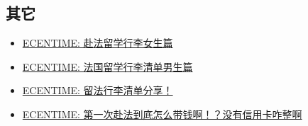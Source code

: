 \subsection{其它}
\begin{itemize}
    \item \href{https://www.ecentime.com/article/nvshengqingdan}{ECENTIME: 赴法留学行李女生篇}
    \item \href{https://www.ecentime.com/article/nanshengqingdan}{ECENTIME: 法国留学行李清单男生篇}
    \item \href{https://www.ecentime.com/article/qingdan}{ECENTIME: 留法行李清单分享！}
    \item \href{https://www.ecentime.com/article/daiqian}{ECENTIME: 第一次赴法到底怎么带钱啊！？没有信用卡咋整啊}
\end{itemize}
